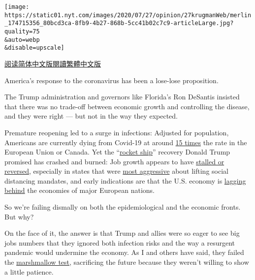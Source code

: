 \texttt{[image: https://static01.nyt.com/images/2020/07/27/opinion/27krugmanWeb/merlin\_174715356\_80bcd3ca-8fb9-4b27-868b-5cc41b02c7c9-articleLarge.jpg?quality=75\\\&auto=webp\\\&disable=upscale]}

\href{https://cn.nytimes.com/opinion/20200728/us-republicans-coronavirus/}{阅读简体中文版}\href{https://cn.nytimes.com/opinion/20200728/us-republicans-coronavirus/zh-hant/}{閱讀繁體中文版}

America's response to the coronavirus has been a lose-lose proposition.

The Trump administration and governors like Florida's Ron DeSantis
insisted that there was no trade-off between economic growth and
controlling the disease, and they were right --- but not in the way they
expected.

Premature reopening led to a surge in infections: Adjusted for
population, Americans are currently dying from Covid-19 at around
\href{https://ourworldindata.org/coronavirus-data-explorer?zoomToSelection=true\&deathsMetric=true\&dailyFreq=true\&perCapita=true\&smoothing=7\&country=USA~CAN~EuropeanUnion\&pickerMetric=location\&pickerSort=asc}{15
times} the rate in the European Union or Canada. Yet the
``\href{https://www.nytimes.com/2020/07/01/business/economic-recovery-virus-surge.html}{rocket
ship}'' recovery Donald Trump promised has crashed and burned: Job
growth appears to have
\href{https://twitter.com/ernietedeschi/status/1286740199796596743}{stalled
or reversed}, especially in states that were
\href{https://www.washingtonpost.com/business/2020/07/21/arizona-struggles-neighboring-new-mexico-found-more-cautious-path-sustained-growth/}{most
aggressive} about lifting social distancing mandates, and early
indications are that the U.S. economy is
\href{https://www.bloomberg.com/news/articles/2020-07-26/europe-s-economy-set-to-outpace-u-s-in-upending-of-past-roles?srnd=premium\&sref=qzusa8bC}{lagging
behind} the economies of major European nations.

So we're failing dismally on both the epidemiological and the economic
fronts. But why?

On the face of it, the answer is that Trump and allies were so eager to
see big jobs numbers that they ignored both infection risks and the way
a resurgent pandemic would undermine the economy. As I and others have
said, they failed the
\href{https://www.nytimes.com/2020/06/09/opinion/coronavirus-reopening-marshmallow-test.html}{marshmallow
test}, sacrificing the future because they weren't willing to show a
little patience.

